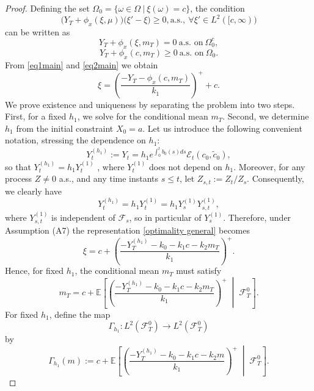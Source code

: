 \documentclass[11pt,a4paper]{article}
\begin{document}
\begin{proof}
Defining the set $\Omega_0= \{ \omega \in \Omega \ | \ \xi(\omega)=c\}$, the condition 
\[\big ( Y_T+ \phi_x(\xi, \mu)\big)\big( \xi'-\xi \big) \geq 0, \text{a.s.}, \ \forall \xi' \in L^2([c, \infty))\] 
can be written as 
\begin{equation}
\label{eq1main}
    Y_T+ \phi_x(\xi, m_T)=0 \ \text{a.s. on} \ \Omega_0^c,
\end{equation}
\begin{equation}
\label{eq2main}
   Y_T+ \phi_x(c, m_T) \geq 0 \ \text{a.s. on} \ \Omega_0. 
\end{equation}
From  \eqref{eq1main} and \eqref{eq2main}  we obtain  
\begin{equation}
\label{optimality general}
    \xi=\left(\dfrac{-Y_T- \phi_x(c, m_T)}{k_1}\right)^+ +c.
\end{equation}
We prove existence and uniqueness by separating the problem into two steps. First, for a fixed \(h_1\), we solve for the conditional mean \(m_T\). Second, we determine \(h_1\) from the initial constraint 
\(X_0=a\).
Let us introduce the following convenient notation, stressing the dependence on $h_1$:
\[ Y_t ^{(h_1)} := Y_t = h_1 e^{\int_0^t b_0(s) ds} \mathcal{E}_t\left( c_0,\tilde{c}_0\right), \]
so that $Y_t ^{(h_1)} = h_1 Y_t ^{(1)}$ , where $Y_t ^{(1)}$  does not depend on $h_1$. Moreover, for any process $Z \neq 0$ a.s., and any time instants $s \leq t$, let $Z_{s,t}:= Z_t /Z_s$. Consequently, we clearly have
\begin{equation}\label{eq:factorY} Y^{(h_1)} _t = h_1 Y_t ^{(1)}=h_1 Y_s^{(1)} Y_{s,t}^{(1)}, \end{equation}
where $Y_{s,t}^{(1)}$ is independent of $\mathcal F_s$, so in particular of $Y_s ^{(1)}$.
Therefore, under Assumption (A7) the representation \eqref{optimality general} becomes
\begin{equation}
\label{xirep}
    \xi=c+\left(\frac{-Y_T^{(h_1)}-k_0-k_1c-k_2m_T}{k_1}\right)^+.
\end{equation}
Hence, for fixed \(h_1\), the conditional mean \(m_T\) must satisfy
\begin{equation}
\label{conditionalmean}
 m_T=c+\mathbb E\left[\left(\frac{-Y_T^{(h_1)}-k_0-k_1c-k_2m_T}{k_1}\right)^+\;\middle|\;\mathcal F_T^0\right].
\end{equation}
For fixed \(h_1\), define the map
\[
\Gamma_{h_1}:L^2(\mathcal F_T^0)\longrightarrow L^2(\mathcal F_T^0)
\]
by
\begin{equation}\label{def:Gamma}
\Gamma_{h_1}(m):=c+\mathbb E\left[\left(\frac{
-Y_T^{(h_1)}-k_0-k_1c-k_2m}{k_1}\right)^+\;\middle|\;\mathcal F_T^0\right].

\end{equation}
\end{proof}
\end{document}
